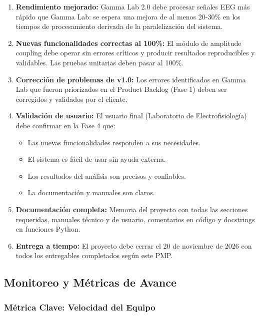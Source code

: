 \documentclass{article}
\begin{document}
\begin{enumerate}
    \item \textbf{Rendimiento mejorado:} Gamma Lab 2.0 debe procesar señales EEG más rápido que Gamma Lab: se espera una mejora de al menos 20-30\% en los tiempos de procesamiento derivada de la paralelización del sistema.
    
    \item \textbf{Nuevas funcionalidades correctas al 100\%:} El módulo de amplitude coupling debe operar sin errores críticos y producir resultados reproducibles y validables. Las pruebas unitarias deben pasar al 100\%.
    
    \item \textbf{Corrección de problemas de v1.0:} Los errores identificados en Gamma Lab que fueron priorizados en el Product Backlog (Fase 1) deben ser corregidos y validados por el cliente.
    
    \item \textbf{Validación de usuario:} El usuario final (Laboratorio de Electrofisiología) debe confirmar en la Fase 4 que:
    \begin{itemize}
        \item Las nuevas funcionalidades responden a sus necesidades.
        \item El sistema es fácil de usar sin ayuda externa.
        \item Los resultados del análisis son precisos y confiables.
        \item La documentación y manuales son claros.
    \end{itemize}
    
    \item \textbf{Documentación completa:} Memoria del proyecto con todas las secciones requeridas, manuales técnico y de usuario, comentarios en código y docstrings en funciones Python.
    
    \item \textbf{Entrega a tiempo:} El proyecto debe cerrar el 20 de noviembre de 2026 con todos los entregables completados según este PMP.
\end{enumerate}

\subsection{Monitoreo y Métricas de Avance}

\subsubsection{Métrica Clave: Velocidad del Equipo}
\end{document}

